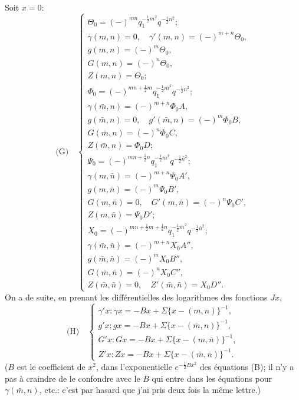 \documentclass[12pt,a4paper]{article}
\begin{document}
\newpage
\setcounter{page}{171}

Soit $x = 0$:
\[
\text{(G)}\quad
\begin{cases}
\Theta_0 = (-)^{mn}q_1^{-\frac12 m^2}q^{-\frac12 n^2};\\[2pt]
\gamma(m,n) = 0,\quad \gamma'(m,n) = (-)^{m+n}\Theta_0,\\
g(m,n) = (-)^{m}\Theta_0,\\
G(m,n) = (-)^{n}\Theta_0,\\
Z(m,n) = \Theta_0;\\[6pt]
\Phi_0 = (-)^{mn + \frac12 m}q_1^{-\frac12\bar m^2}q^{-\frac12 n^2};\\[2pt]
\gamma(\bar m, n) = (-)^{m+n}\Phi_0 A,\\
g(\bar m, n) = 0,\quad g'(\bar m, n) = (-)^m\Phi_0 B,\\
G(\bar m, n) = (-)^n\Phi_0 C,\\
Z(\bar m, n) = \Phi_0 D;\\[6pt]
\Psi_0 = (-)^{mn + \frac12 n}q_1^{-\frac12 m^2}q^{-\frac12\bar n^2};\\[2pt]
\gamma(m, \bar n) = (-)^{m+n}\Psi_0 A',\\
g(m, \bar n) = (-)^m\Psi_0 B',\\
G(m, \bar n) = 0,\quad G'(m,\bar n) = (-)^n\Psi_0 C',\\
Z(m, \bar n) = \Psi_0 D';\\[6pt]
X_0 = (-)^{mn + \frac12 m + \frac12 n}q_1^{-\frac12\bar m^2}q^{-\frac12\bar n^2};\\[2pt]
\gamma(\bar m, \bar n) = (-)^{m+n}X_0 A'',\\
g(\bar m, \bar n) = (-)^m X_0 B'',\\
G(\bar m, \bar n) = (-)^n X_0 C'',\\
Z(\bar m, \bar n) = 0,\quad Z'(\bar m,\bar n) = X_0 D''.
\end{cases}
\]
On a de suite, en prenant les diff\'erentielles des logarithmes des fonctions $Jx$,
\[
\text{(H)}\quad
\begin{cases}
\gamma' x : \gamma x = -Bx + \Sigma\{x - (m,n)\}^{-1},\\
g' x : g x = -Bx + \Sigma\{x - (\bar m,n)\}^{-1},\\
G' x : G x = -Bx + \Sigma\{x - (m,\bar n)\}^{-1},\\
Z' x : Z x = -Bx + \Sigma\{x - (\bar m,\bar n)\}^{-1}.
\end{cases}
\]
($B$ est le coefficient de $x^2$, dans l'exponentielle $e^{-\frac12 Bx^2}$ des \'equations (B); il n'y a pas \`a craindre de le confondre avec le $B$ qui entre dans les \'equations pour $\gamma(\bar m, n)$, etc.: c'est par hasard que j'ai pris deux fois la m\^eme lettre.)
\end{document}
